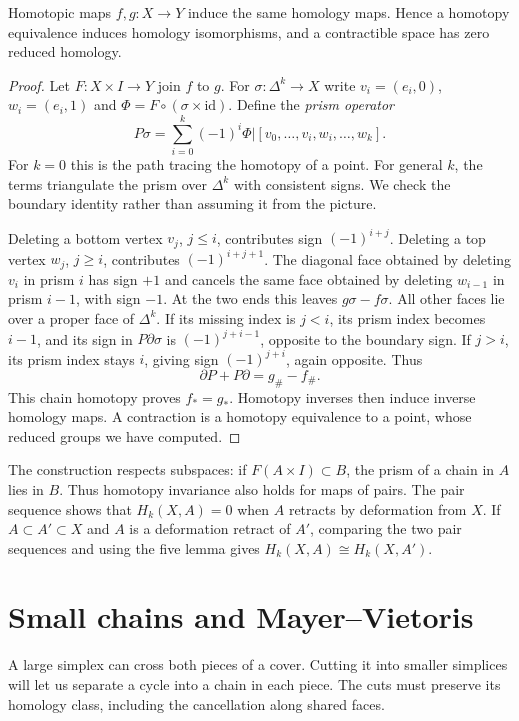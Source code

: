 \begin{theorem}\label{thm:homotopyH}
Homotopic maps $f,g:X\to Y$ induce the same homology maps. Hence a homotopy equivalence induces homology isomorphisms, and a contractible space has zero reduced homology.
\end{theorem}

\begin{proof}
Let $F:X\times I\to Y$ join $f$ to $g$. For $\sigma:\Delta^k\to X$ write $v_i=(e_i,0)$, $w_i=(e_i,1)$ and $\Phi=F\circ(\sigma\times\mathrm{id})$. Define the \emph{prism operator}
\[
P\sigma=\sum_{i=0}^k(-1)^i\Phi|[v_0,\ldots,v_i,w_i,\ldots,w_k].
\]
For $k=0$ this is the path tracing the homotopy of a point. For general $k$, the terms triangulate the prism over $\Delta^k$ with consistent signs. We check the boundary identity rather than assuming it from the picture.

Deleting a bottom vertex $v_j$, $j\le i$, contributes sign $(-1)^{i+j}$. Deleting a top vertex $w_j$, $j\ge i$, contributes $(-1)^{i+j+1}$. The diagonal face obtained by deleting $v_i$ in prism $i$ has sign $+1$ and cancels the same face obtained by deleting $w_{i-1}$ in prism $i-1$, with sign $-1$. At the two ends this leaves $g\sigma-f\sigma$. All other faces lie over a proper face of $\Delta^k$. If its missing index is $j<i$, its prism index becomes $i-1$, and its sign in $P\partial\sigma$ is $(-1)^{j+i-1}$, opposite to the boundary sign. If $j>i$, its prism index stays $i$, giving sign $(-1)^{j+i}$, again opposite. Thus
\[
\partial P+P\partial=g_\#-f_\#.
\]
This chain homotopy proves $f_*=g_*$. Homotopy inverses then induce inverse homology maps. A contraction is a homotopy equivalence to a point, whose reduced groups we have computed.
\end{proof}

The construction respects subspaces: if $F(A\times I)\subset B$, the prism of a chain in $A$ lies in $B$. Thus homotopy invariance also holds for maps of pairs. The pair sequence shows that $H_k(X,A)=0$ when $A$ retracts by deformation from $X$. If $A\subset A'\subset X$ and $A$ is a deformation retract of $A'$, comparing the two pair sequences and using the five lemma gives $H_k(X,A)\cong H_k(X,A')$.

\section{Small chains and Mayer--Vietoris}

A large simplex can cross both pieces of a cover. Cutting it into smaller simplices will let us separate a cycle into a chain in each piece. The cuts must preserve its homology class, including the cancellation along shared faces.

